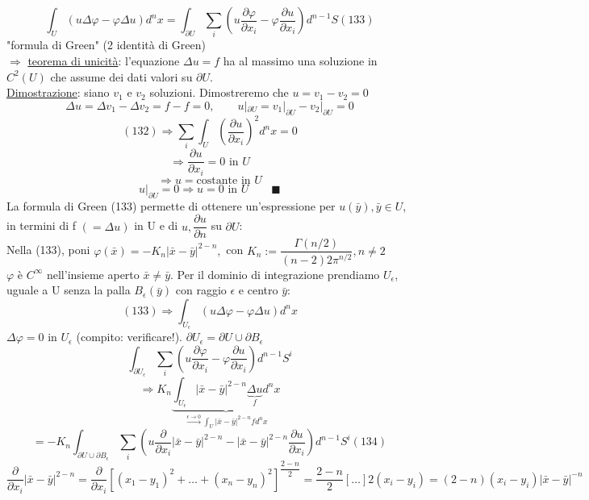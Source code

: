 \documentclass[a4paper,11pt]{report}
\newcommand{\x}{\bar{x}}
\newcommand{\y}{\bar{y}}
\begin{document}
\begin{equation}
\int_U \left(u\Delta \varphi - \varphi \Delta u\right)d^n x=\int_{\partial U} \sum_i \left( u\dfrac{\partial \varphi}{\partial x_i} - \varphi \dfrac{\partial u}{\partial x_i}\right) d^{n-1}S (133)
\end{equation}
"formula di Green" (2 identità di Green)\\
$\Rightarrow$ \underline{teorema di unicità}: l'equazione $\Delta u = f$ ha al massimo una soluzione in $C^2(U)$ che assume dei dati valori su $\partial U$.\\
\underline{Dimostrazione}: siano $v_1$ e $v_2$ soluzioni. Dimostreremo che $u=v_1 - v_2=0$
$$
\Delta u=\Delta v_1 - \Delta v_2 = f-f =0, \qquad u|_{\partial U} = v_1 |_{\partial U} - v_2 |_{\partial U}=0
$$
$$
(132)\Rightarrow \sum_i\int_U \left(\dfrac{\partial u}{\partial x_i}\right)^2 d^n x=0
$$
$$
\Rightarrow \dfrac{\partial u}{\partial x_i}=0 \text{ in }U
$$
$$
\Rightarrow u= \text{costante in }U
$$
$$
\left.u\right|_{\partial U}=0 \Rightarrow u=0 \text{ in }U \qquad \blacksquare
$$
La formula di Green (133) permette di ottenere un'espressione per $ u(\y),\y \in U$, in termini di f $(=\Delta u)$ in U e di $u,\dfrac{\partial u}{\partial n}$ su $\partial U$:\\
Nella (133), poni $\varphi(\x)=-K_n|\x-\y|^{2-n},$ con $K_n:= \dfrac{\Gamma (n/2)}{(n-2)2\pi ^{n/2}}, n\neq 2$\\
$\varphi$ è $C^\infty$ nell'insieme aperto $\x \neq \y$. Per il dominio di integrazione prendiamo $U_\epsilon$, uguale a U senza la palla $B_\epsilon(\y)$ con raggio $\epsilon$ e centro $\y$:
$$
(133)\Rightarrow \int_{U_\epsilon} \left(u\Delta\varphi - \varphi \Delta u\right)d^n x
$$
$\Delta \varphi = 0$ in $U_\epsilon$ (compito: verificare!). $\partial U_\epsilon=\partial U \cup \partial B_\epsilon$
$$
\int_{\partial U_\epsilon}\sum_i \left( u\dfrac{\partial \varphi}{\partial x_i} - \varphi \dfrac{\partial u}{\partial x_i}\right)d^{n-1}S^i
$$
$$
\Rightarrow K_n \underset{\overset{\epsilon \to 0}{\rightarrow}\int_U |\x - \y|^{2-n}f d^n x}{\underbrace{\int_{U_\epsilon}|\x-\y|^{2-n}\underset{f}{\underbrace{\Delta u}} d^n x}}
$$
\begin{equation}
=-K_n \int_{\partial U \cup \partial B_\epsilon}\sum_i \left(u\dfrac{\partial}{\partial x_i}|\x-\y|^{2-n} - |\x-\y|^{2-n}\dfrac{\partial u}{\partial x_i} \right)d^{n-1}S^i (134)
\end{equation}
$$
\dfrac{\partial}{\partial x_i}|\x - \y|^{2-n}=\dfrac{\partial}{\partial x_i}\left[ (x_1-y_1)^2 + \dots + (x_n - y_n)^2\right]^{\dfrac{2-n}{2}}=\dfrac{2-n}{2}[\dots]2(x_i-y_i)=(2-n)(x_i-y_i)|\x-\y|^{-n}
$$
\end{document}

